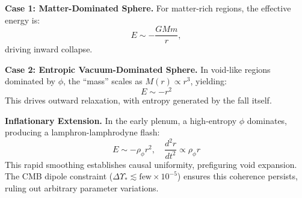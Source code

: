\documentclass{article}
\begin{document}
\textbf{Case 1: Matter-Dominated Sphere.} For matter-rich regions, the effective energy is:
\[
E \sim -\frac{G M m}{r},
\]
driving inward collapse.

\textbf{Case 2: Entropic Vacuum-Dominated Sphere.} In void-like regions dominated by \(\phi\), the ``mass'' scales as \(M(r) \propto r^3\), yielding:
\[
E \sim -r^2
\]
This drives outward relaxation, with entropy generated by the fall itself.

\textbf{Inflationary Extension.} In the early plenum, a high-entropy \(\phi\) dominates, producing a lamphron-lamphrodyne flash:
\[
E \sim - \rho_{\phi} r^2, \quad \frac{d^2 r}{dt^2} \propto \rho_{\phi} r
\]
This rapid smoothing establishes causal uniformity, prefiguring void expansion. The CMB dipole constraint (\(\Delta \Upsilon_* \lesssim \text{few} \times 10^{-5}\)) ensures this coherence persists, ruling out arbitrary parameter variations.

\newpage


\end{document}

